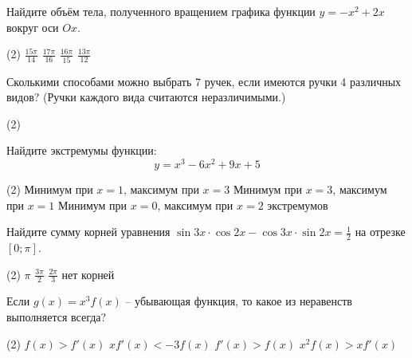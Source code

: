 \documentclass[14pt]{article}
\begin{document}
\begin{taskbox}
Найдите объём тела, полученного вращением графика функции $y = -x^2 + 2x$ вокруг оси $Ox$.
 \vspace{0.2cm} \begin{tasks}(2)
\task $\frac{15\pi}{14}$
\task $\frac{17\pi}{16}$
\task $\frac{16\pi}{15}$
\task $\frac{13\pi}{12}$
\end{tasks}
\vspace{2cm}
\end{taskbox}


\begin{taskbox}
Сколькими способами можно выбрать 7 ручек, если имеются ручки 4 различных видов? (Ручки каждого вида считаются неразличимыми.)
 \vspace{0.2cm} \begin{tasks}(2)
\end{tasks}
\vspace{2cm}
\end{taskbox}


\begin{taskbox}
Найдите экстремумы функции:
\[
y = x^3 - 6x^2 + 9x + 5
\]
 \vspace{0.2cm} \begin{tasks}(2)
 \task Минимум при $x = 1$, максимум при $x = 3$
\task Минимум при $x = 3$, максимум при $x = 1$
\task Минимум при $x = 0$, максимум при $x = 2$
 экстремумов
 
\end{tasks}
\vspace{2cm}
\end{taskbox}


\begin{taskbox}
Найдите сумму корней уравнения $\sin 3x \cdot \cos 2x - \cos 3x \cdot \sin 2x = \frac{1}{2}$ на отрезке $[0; \pi]$.
 \vspace{0.2cm} \begin{tasks}(2)
\task $\pi$
\task $\frac{3\pi}{2}$
\task $\frac{2\pi}{3}$
\task нет корней
\end{tasks}
\vspace{2cm}
\end{taskbox}


\begin{taskbox}
Если $g(x) = x^3 f(x)$ – убывающая функция, то какое из неравенств выполняется всегда?
 \vspace{0.2cm} \begin{tasks}(2)
\task $f(x) > f'(x)$
\task $x f'(x) < -3f(x)$
\task $f'(x) > f(x)$
\task $x^2 f(x) > x f'(x)$
\end{tasks}
\vspace{2cm}
\end{taskbox}
\end{document}

